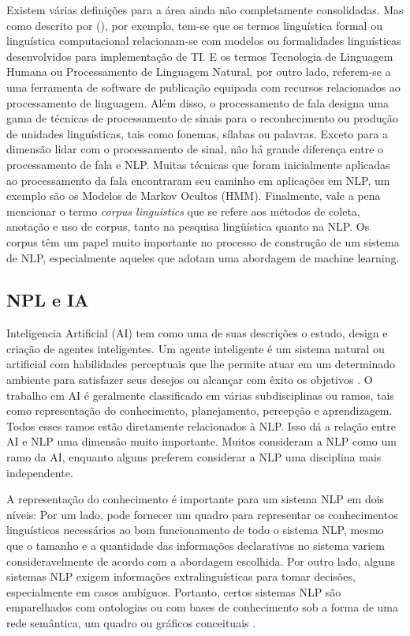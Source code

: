 \documentclass[
	12pt,				%
	openright,			%
	oneside,			%
	a4paper,			%
	english,			%
	spanish,			%
	brazil				%
	]{abntex2}
\begin{document}
Existem várias definições para a área ainda não completamente consolidadas. Mas como descrito por  \citeauthor{book_natural_lang} (\citeyear{book_natural_lank}), por exemplo, tem-se que os termos linguística formal ou linguística computacional relacionam-se com modelos ou formalidades linguísticas desenvolvidos para implementação de TI. E os termos Tecnologia de Linguagem Humana ou Processamento de Linguagem Natural, por outro lado, referem-se a uma ferramenta de software de publicação equipada com recursos relacionados ao processamento de linguagem. Além disso, o processamento de fala designa uma gama de técnicas de processamento de sinais para o reconhecimento ou produção de unidades linguísticas, tais como fonemas, sílabas ou palavras. Exceto para a dimensão lidar com o processamento de sinal, não há grande diferença entre o processamento de fala e NLP. Muitas técnicas que foram inicialmente aplicadas ao processamento da fala encontraram seu caminho em aplicações em NLP, um exemplo são os Modelos de Markov Ocultos (HMM). Finalmente, vale a pena mencionar o termo \textit{corpus linguistics}  que se refere aos métodos de coleta, anotação e uso de corpus, tanto na pesquisa lingüística quanto na NLP. Os corpus têm um papel muito importante no processo de construção de um sistema de NLP, especialmente aqueles que adotam uma abordagem de machine learning.

	\subsection*{NPL e IA}
	Inteligencia Artificial (AI) tem como uma de suas descrições o estudo, design e criação de agentes inteligentes. Um agente inteligente é um sistema natural ou artificial com habilidades perceptuais que lhe permite atuar em um determinado ambiente para satisfazer seus desejos ou alcançar com êxito os objetivos \cite{norvig}. O trabalho em AI é geralmente classificado em várias subdisciplinas ou ramos, tais como representação do conhecimento, planejamento, percepção e aprendizagem. Todos esses ramos estão diretamente relacionados à NLP. Isso dá a relação entre AI e NLP uma dimensão muito importante. Muitos consideram a NLP como um ramo da AI, enquanto alguns preferem considerar a NLP uma disciplina mais independente. 
	
A representação do conhecimento é importante para um sistema NLP em dois níveis: Por um lado, pode fornecer um quadro para representar os conhecimentos linguísticos necessários ao bom funcionamento de todo o sistema NLP, mesmo que o tamanho e a quantidade das informações declarativas no sistema variem consideravelmente de acordo com a abordagem escolhida. Por outro lado, alguns sistemas NLP exigem informações extralinguísticas para tomar decisões, especialmente em casos ambíguos. Portanto, certos sistemas NLP são emparelhados com ontologias ou com bases de conhecimento sob a forma de uma rede semântica, um quadro ou gráficos conceituais \cite{book_natural_lang}.
\end{document}
